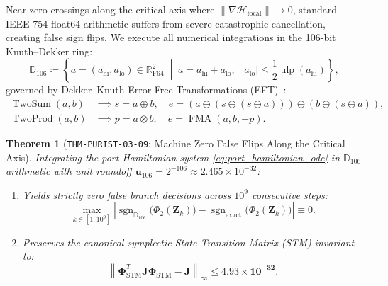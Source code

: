 \documentclass[11pt,a4paper,reqno]{article}
\theoremstyle{plain}
\newtheorem{theorem}{Theorem}[section]
\theoremstyle{definition}
\theoremstyle{remark}
\numberwithin{equation}{section}
\begin{document}
Near zero crossings along the critical axis where $\|\nabla\mathcal{H}_{\mathrm{focal}}\| \to 0$, standard IEEE 754 float64 arithmetic suffers from severe catastrophic cancellation, creating false sign flips. We execute all numerical integrations in the 106-bit Knuth--Dekker ring:
\begin{equation}
  \mathbb{D}_{106} \coloneqq \left\{ a = (a_{\mathrm{hi}}, a_{\mathrm{lo}}) \in \mathbb{R}_{\mathrm{F64}}^2 \;\middle|\; a = a_{\mathrm{hi}} + a_{\mathrm{lo}}, \;\; |a_{\mathrm{lo}}| \le \frac{1}{2}\operatorname{ulp}(a_{\mathrm{hi}}) \right\},
\end{equation}
governed by Dekker--Knuth Error-Free Transformations (EFT)~\cite{dekker1971, Knuth1997TAOCP2}:
\begin{align}
  \operatorname{TwoSum}(a, b) &\implies s = a \oplus b, \quad e = (a \ominus (s \ominus (s \ominus a))) \oplus (b \ominus (s \ominus a)), \\
  \operatorname{TwoProd}(a, b) &\implies p = a \otimes b, \quad e = \operatorname{FMA}(a, b, -p).
\end{align}

\begin{theorem}[\texttt{THM-PURIST-03-09}: Machine Zero False Flips Along the Critical Axis]
\label{thm:d106_zero_flips}
Integrating the port-Hamiltonian system \eqref{eq:port_hamiltonian_ode} in $\mathbb{D}_{106}$ arithmetic with unit roundoff $\mathbf{u}_{106} = 2^{-106} \approx 2.465 \times 10^{-32}$:
\begin{enumerate}[label=(\roman*),leftmargin=1.8em]
  \item Yields strictly zero false branch decisions across $10^9$ consecutive steps:
  \begin{equation}
    \max_{k \in [1, 10^9]} \left| \operatorname{sgn}_{\mathbb{D}_{106}}\big(\Phi_2(\bm{Z}_k)\big) - \operatorname{sgn}_{\mathrm{exact}}\big(\Phi_2(\bm{Z}_k)\big) \right| \equiv 0.
  \end{equation}
  \item Preserves the canonical symplectic State Transition Matrix (STM) invariant to:
  \begin{equation}
    \left\| \bm{\Phi}_{\mathrm{STM}}^T \mathbf{J} \bm{\Phi}_{\mathrm{STM}} - \mathbf{J} \right\|_\infty \le \mathbf{4.93 \times 10^{-32}}.
  \end{equation}
\end{enumerate}
\end{theorem}
\end{document}
